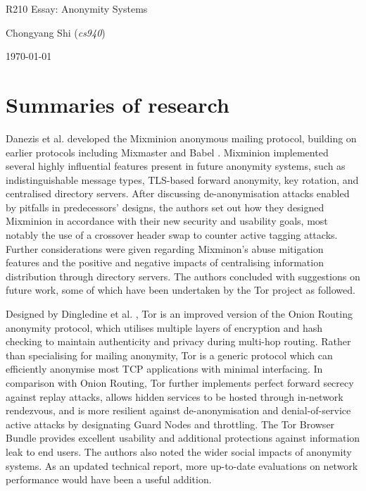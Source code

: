\documentclass[11pt]{article}
\begin{document}
\centerline{\Large R210 Essay:  Anonymity Systems}
\vspace{2em}
\centerline{\large Chongyang Shi (\emph{cs940})}
\vspace{1em}
\centerline{\large \today}
\vspace{1em}

\section{Summaries of research}

Danezis et al. \cite{danezis2003mixminion} developed the Mixminion anonymous mailing protocol, building on earlier protocols including Mixmaster \cite{moller2003mixmaster} and Babel \cite{gulcu1996mixing}.  Mixminion implemented several highly influential features present in future anonymity systems, such as indistinguishable message types, TLS-based forward anonymity, key rotation, and centralised directory servers. After discussing de-anonymisation attacks enabled by pitfalls in predecessors' designs, the authors set out how they designed Mixminion in accordance with their new security and usability goals, most notably the use of a crossover header swap to counter active tagging attacks. Further considerations were given regarding Mixminon's abuse mitigation features and the positive and negative impacts of centralising information distribution through directory servers. The authors concluded with suggestions on future work, some of which have been undertaken by the Tor project as followed.

Designed by Dingledine et al. \cite{dingledine2014tor}, Tor is an improved version of the Onion Routing anonymity protocol, which utilises multiple layers of encryption and hash checking to maintain authenticity and privacy during multi-hop routing. Rather than specialising for mailing anonymity, Tor is a generic protocol which can efficiently anonymise most TCP applications with minimal interfacing. In comparison with Onion Routing, Tor further implements perfect forward secrecy against replay attacks, allows hidden services to be hosted through in-network rendezvous, and is more resilient against de-anonymisation and denial-of-service active attacks by designating Guard Nodes and throttling. The Tor Browser Bundle provides excellent usability and additional protections against information leak to end users. The authors also noted the wider social impacts of anonymity systems. As an updated technical report, more up-to-date evaluations on network performance would have been a useful addition.
\end{document}
